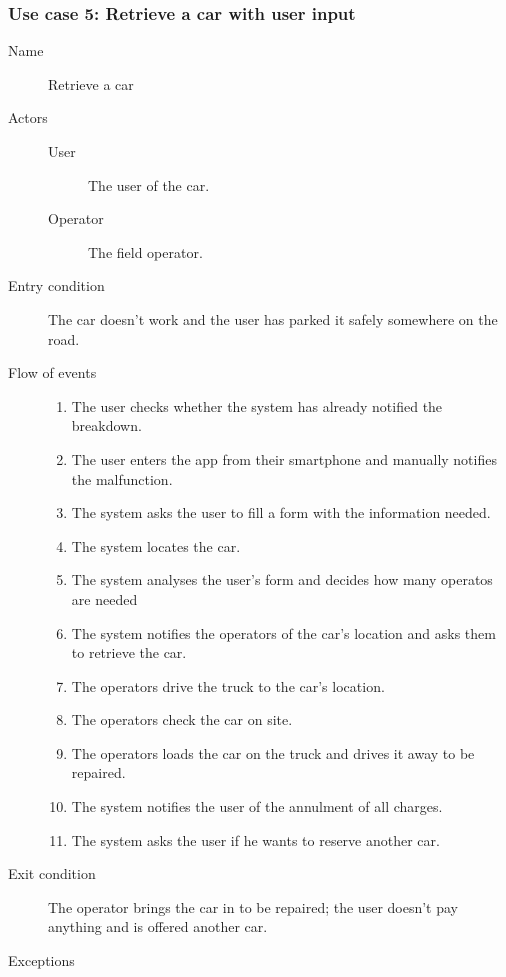 	\subsubsection{Use case 5: Retrieve a car with user input}
		\begin{description}
			\item[Name] Retrieve a car
			\item[Actors] \hfill
			\begin{description}
				\item[User] The user of the car.
				\item[Operator] The field operator.
			\end{description}
			\item[Entry condition] The car doesn't work and the user has parked it safely somewhere on the road.
			\item[Flow of events] \hfill
			\begin{enumerate}
				\item The user checks whether the system has already notified the breakdown.
				\item The user enters the app from their smartphone and manually notifies the malfunction.
				\item The system asks the user to fill a form with the information needed.
				\item The system locates the car.
				\item The system analyses the user's form and decides how many operatos are needed
				\item The system notifies the operators of the car's location and asks them to retrieve the car.
				\item The operators drive the truck to the car's location.
				\item The operators check the car on site.
				\item The operators loads the car on the truck and drives it away to be repaired.
				\item The system notifies the user of the annulment of all charges.
				\item The system asks the user if he wants to reserve another car.
			\end{enumerate}
			\item[Exit condition] The operator brings the car in to be repaired; the user doesn't pay anything and is offered another car.
			\item[Exceptions] \hfill

\end{description}
